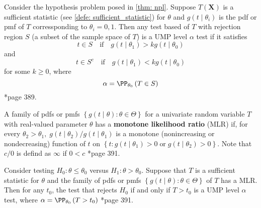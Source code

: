 \begin{cor} \label{cor: npl_cor}
    Consider the hypothesis problem posed in \ref{thm: npl}. Suppose $T(\bm{X})$ is a sufficient statistic (see \ref{defe: sufficient_statistic}) for $\theta$ and $g(t \mid \theta_i)$ is the pdf or pmf of $T$ corressponding to $\theta_i  = 0,1$. Then any test based of $T$ with rejection region $S$ (a subset of the sample space of $T$) is a UMP level $\alpha$ test if it satisfies
    \begin{equation} \label{eqn: npl_cor_cond_1}
        t \in S \quad \text{if} \quad g(t \mid \theta_1) > k g(t \mid \theta_0)
    \end{equation}
    and
    \begin{equation} \label{eqn: npl_cor_cond_2}
        t \in S^c \quad \text{if} \quad g(t \mid \theta_1) < k g(t \mid \theta_0)
    \end{equation}
    for some $k \geq 0$, where
    \begin{equation} \label{eqn: npl_cor_cond_3}
        \alpha = \PP_{\theta_0} \left( T \in S \right)
    \end{equation}
    \cite{CasellaGeorge2001SI}*{page 389}.
\end{cor}

\begin{defe} \label{defe: MLR}
    A family of pdfs or pmfs $\left\{ g(t \mid \theta) : \theta \in \Theta \right\}$ for a univariate random variable $T$ with real-valued parameter $\theta$ has a {\bf monotone likelihood ratio} (MLR) if, for every $\theta_2 > \theta_1, \; g(t \mid \theta_2) / g(t \mid \theta_1)$ is a monotone (nonincreasing or nondecreasing) function of $t$ on $\left\{ t : g(t \mid \theta_1) > 0 \; \text{or} \; g(t \mid \theta_2) > 0\right\}$. Note that $c/0$ is defind as $\infty$ if $0 < c$ \cite{CasellaGeorge2001SI}*{page 391}.
\end{defe}

\begin{thm} \label{thm: kr}
    Consider testing $H_0 : \theta \leq \theta_0$ versus $H_1 : \theta > \theta_0$. Suppose that $T$ is a sufficient statistic for $\theta$ and the family of pdfs or pmfs $\left\{ g(t \mid \theta) : \theta \in \Theta \right\}$ of $T$ has a MLR. Then for any $t_0$, the test that rejects $H_0$ if and only if $T > t_0$ is a UMP level $\alpha$ test, where $\alpha = \PP_{\theta_0} \left( T > t_0 \right)$ \cite{CasellaGeorge2001SI}*{page 391}.
\end{thm}

